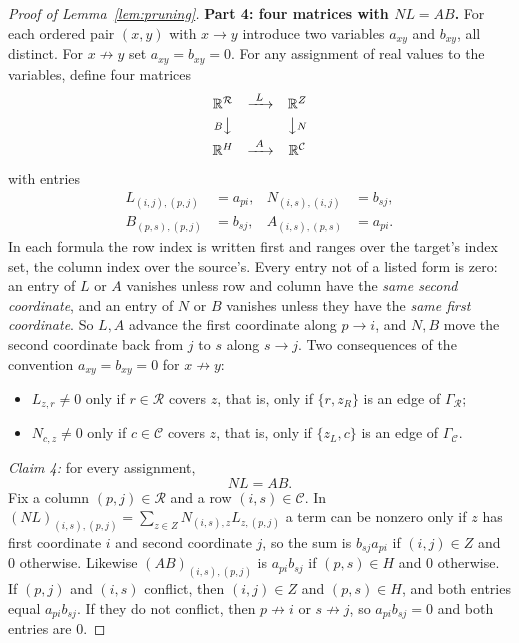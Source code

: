 \documentclass[11pt]{article}
\theoremstyle{remark}
\newcommand{\R}{\mathbb R}
\newcommand{\Step}[1]{\par\medskip\noindent\textbf{#1}\enspace}
\newcommand{\cR}{\mathcal R}
\newcommand{\cC}{\mathcal C}
\begin{document}
\begin{proof}[Proof of Lemma~\ref{lem:pruning}]
\Step{Part 4: four matrices with $NL=AB$.}
For each ordered pair $(x,y)$ with $x\to y$ introduce two variables
$a_{xy}$ and $b_{xy}$, all distinct. For $x\not\to y$ set
$a_{xy}=b_{xy}=0$. For any assignment of real values to the variables,
define four matrices
\[
 \begin{array}{ccc}
 \R^{\mathcal R}&\xrightarrow{\ L\ }&\R^Z\\[3pt]
 {\scriptstyle B}\big\downarrow&&\big\downarrow{\scriptstyle N}\\[3pt]
 \R^H&\xrightarrow{\ A\ }&\R^{\mathcal C}
 \end{array}
\]
with entries
\begin{equation}\label{eq:pruning-maps}
 \begin{aligned}
 L_{(i,j),(p,j)}&=a_{pi},&
 N_{(i,s),(i,j)}&=b_{sj},\\
 B_{(p,s),(p,j)}&=b_{sj},&
 A_{(i,s),(p,s)}&=a_{pi}.
 \end{aligned}
\end{equation}
In each formula the row index is written first and ranges over the target's
index set, the column index over the source's. Every entry not of a listed
form is zero: an entry of $L$ or $A$ vanishes unless row and column have the
\emph{same second coordinate}, and an entry of $N$ or $B$ vanishes unless
they have the \emph{same first coordinate}. So $L,A$ advance the first
coordinate along $p\to i$, and $N,B$ move the second coordinate back from
$j$ to $s$ along $s\to j$. Two consequences of the convention
$a_{xy}=b_{xy}=0$ for $x\not\to y$:
\begin{itemize}[leftmargin=2em]
\item[(O1)] $L_{z,r}\ne0$ only if $r\in\cR$ covers $z$, that is, only if
$\{r,z_R\}$ is an edge of $\Gamma_{\cR}$;
\item[(O2)] $N_{c,z}\ne0$ only if $c\in\cC$ covers $z$, that is, only if
$\{z_L,c\}$ is an edge of $\Gamma_{\cC}$.
\end{itemize}

\emph{Claim 4:} for every assignment,
\begin{equation}\label{eq:pruning-commute}
 NL=AB.
\end{equation}
Fix a column $(p,j)\in\cR$ and a row $(i,s)\in\cC$. In
$(NL)_{(i,s),(p,j)}=\sum_{z\in Z}N_{(i,s),z}L_{z,(p,j)}$ a term can be
nonzero only if $z$ has first coordinate $i$ and second coordinate $j$, so
the sum is $b_{sj}a_{pi}$ if $(i,j)\in Z$ and $0$ otherwise. Likewise
$(AB)_{(i,s),(p,j)}$ is $a_{pi}b_{sj}$ if $(p,s)\in H$ and $0$ otherwise. If
$(p,j)$ and $(i,s)$ conflict, then $(i,j)\in Z$ and $(p,s)\in H$, and both
entries equal $a_{pi}b_{sj}$. If they do not conflict, then $p\not\to i$ or
$s\not\to j$, so $a_{pi}b_{sj}=0$ and both entries are $0$.


\end{proof}
\end{document}

